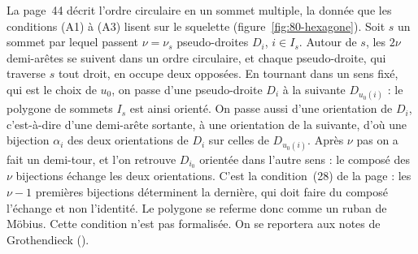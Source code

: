 {\small La page~44 décrit l'ordre circulaire en un sommet multiple, la donnée que les conditions (A1) à (A3) lisent sur le squelette (figure~\ref{fig:80-hexagone}). Soit $s$ un sommet par lequel passent $\nu = \nu_s$ pseudo-droites $D_i$, $i \in I_s$. Autour de $s$, les $2\nu$ demi-arêtes se suivent dans un ordre circulaire, et chaque pseudo-droite, qui traverse $s$ tout droit, en occupe deux opposées. En tournant dans un sens fixé, qui est le choix de $u_0$, on passe d'une pseudo-droite $D_i$ à la suivante $D_{u_0(i)}$ : le polygone de sommets $I_s$ est ainsi orienté. On passe aussi d'une orientation de $D_i$, c'est-à-dire d'une demi-arête sortante, à une orientation de la suivante, d'où une bijection $\alpha_i$ des deux orientations de $D_i$ sur celles de $D_{u_0(i)}$. Après $\nu$ pas on a fait un demi-tour, et l'on retrouve $D_{i_0}$ orientée dans l'autre sens : le composé des $\nu$ bijections échange les deux orientations. C'est la condition~(28) de la page : les $\nu - 1$ premières bijections déterminent la dernière, qui doit faire du composé l'échange et non l'identité. Le polygone se referme donc comme un ruban de Möbius. Cette condition n'est pas formalisée. On se reportera aux notes de Grothendieck ().\par}

